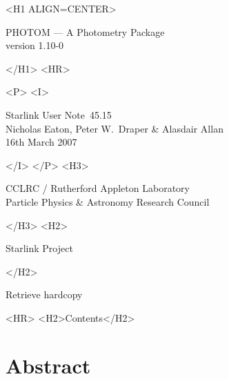 \documentclass[twoside,11pt]{article}
\newcommand{\stardoccategory}  {Starlink User Note}
\newcommand{\stardocsource}    {sun\stardocnumber}
\newcommand{\stardocnumber}    {45.15}
\newcommand{\stardocauthors}   {Nicholas Eaton, Peter W.\ Draper \& Alasdair Allan}
\newcommand{\stardocdate}      {16th March 2007}
\newcommand{\stardoctitle}     {PHOTOM --- A Photometry Package }
\newcommand{\stardocversion}   {version 1.10-0}
\newcommand{\htmladdnormallink}[2]{#1}
\newcommand{\htmladdimg}[1]{}
\newcommand{\htmlref}[2]{#1}
\newcommand{\htmladdtonavigation}[1]{}
\newcommand{\xlabel}[1]{}
\renewcommand{\_}{\texttt{\symbol{95}}}
\begin{document}
\begin{htmlonly}
   \xlabel{}
   \begin{rawhtml} <H1 ALIGN=CENTER> \end{rawhtml}
      \stardoctitle\\
      \stardocversion

    \htmladdimg{sun45fig.gif}

   \begin{rawhtml} </H1> <HR> \end{rawhtml}

   \begin{rawhtml} <P> <I> \end{rawhtml}
   \stardoccategory\ \stardocnumber \\
   \stardocauthors \\
   \stardocdate
   \begin{rawhtml} </I> </P> <H3> \end{rawhtml}
      \htmladdnormallink{CCLRC}{http://www.cclrc.ac.uk} /
      \htmladdnormallink{Rutherford Appleton Laboratory}
                        {http://www.cclrc.ac.uk/ral} \\
      \htmladdnormallink{Particle Physics \& Astronomy Research Council}
                        {http://www.pparc.ac.uk} \\
   \begin{rawhtml} </H3> <H2> \end{rawhtml}
      \htmladdnormallink{Starlink Project}{http://star-www.rl.ac.uk/}
   \begin{rawhtml} </H2> \end{rawhtml}
   \htmladdnormallink{\htmladdimg{source.gif} Retrieve hardcopy}
      {http://star-www.rl.ac.uk/cgi-bin/hcserver?\stardocsource}\\

  \label{stardoccontents}
  \begin{rawhtml}
    <HR>
    <H2>Contents</H2>
  \end{rawhtml}
  \htmladdtonavigation{\htmlref{\htmladdimg{contents_motif.gif}}
        {stardoccontents}}

  \section{\xlabel{abstract}Abstract}
\end{htmlonly}
\end{document}
